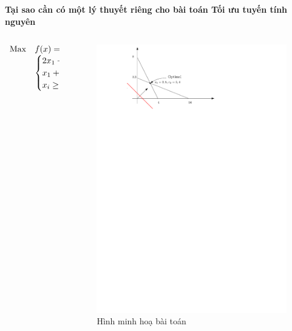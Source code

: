 \documentclass{beamer}
\begin{document}
\begin{frame}{\bf Tại sao cần có một lý thuyết riêng cho bài toán Tối ưu tuyến tính nguyên}

\begin{columns}
    \begin{column}{0.5\textwidth}
        \begin{equation*}
        \begin{array}{lll}            
        {\rm Max}&f(x)=2x_1+2x_2\\
        & \begin{cases}
        2x_1+x_2 \leq  8 \\
        x_1+3x_2 \leq 10 \\
        x_i\geq 0,\forall i=1,2.
        \end{cases} 
        \end{array}
        \end{equation*}
    \end{column}

    \begin{column}{0.5\textwidth}
        \begin{figure}
        \centering
        \includegraphics[width=1\linewidth]{Nhom1_hinh.pdf}
        \caption{Hình minh hoạ bài toán}
        \end{figure}
    \end{column}
\end{columns}
\end{frame}
\end{document}
